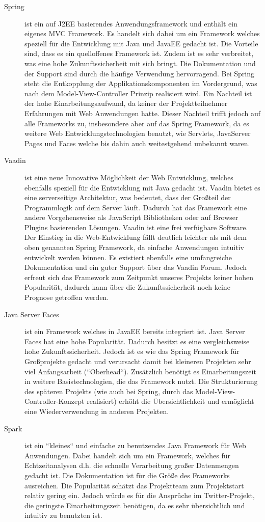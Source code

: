 \begin{description}
	\item [Spring] ist ein auf J2EE basierendes Anwendungsframework und enthält ein eigenes MVC Framework. Es handelt sich dabei um ein Framework welches speziell für die Entwicklung mit Java und JavaEE gedacht ist. Die Vorteile sind, dass es ein quelloffenes Framework ist. Zudem ist es sehr verbreitet, was eine hohe Zukunftssicherheit mit sich bringt. Die Dokumentation und der Support sind durch die häufige Verwendung hervorragend. Bei Spring steht die Entkopplung der Applikationskomponenten im Vordergrund, was nach dem Model-View-Controller Prinzip realisiert wird. Ein Nachteil ist der hohe Einarbeitungsaufwand, da keiner der Projektteilnehmer Erfahrungen mit Web Anwendungen hatte. Dieser Nachteil trifft jedoch auf alle Frameworks zu, insbesondere aber auf das Spring Framework, da es weitere Web Entwicklungstechnologien benutzt, wie Servlets, JavaServer Pages und Faces welche bis dahin auch weitestgehend unbekannt waren.
	\item [Vaadin] ist eine neue Innovative Möglichkeit der Web Entwicklung, welches ebenfalls speziell für die Entwicklung mit Java gedacht ist. Vaadin bietet es eine serverseitige Architektur, was bedeutet, dass der Großteil der Programmlogik auf dem Server läuft. Dadurch hat das Framework eine andere Vorgehensweise als JavaScript Bibliotheken oder auf Browser Plugins basierenden Lösungen. Vaadin ist eine frei verfügbare Software. Der Einstieg in die Web-Entwicklung fällt deutlich leichter als mit dem oben genannten Spring Framework, da einfache Anwendungen intuitiv entwickelt werden können. Es existiert ebenfalls eine umfangreiche Dokumentation und ein guter Support über das Vaadin Forum. Jedoch erfreut sich das Framework zum Zeitpunkt unseres Projekts keiner hohen Popularität, dadurch kann über die Zukunftssicherheit noch keine Prognose getroffen werden. 
	\item [Java Server Faces] ist ein Framework welches in JavaEE bereits integriert ist. Java Server Faces hat eine hohe Popularität. Dadurch besitzt es eine vergleichsweise hohe Zukunftssicherheit. Jedoch ist es wie das Spring Framework für Großprojekte gedacht und verursacht damit bei kleineren Projekten sehr viel Anfangsarbeit (“Oberhead“). Zusätzlich benötigt es Einarbeitungszeit in weitere Basistechnologien, die das Framework nutzt. Die Strukturierung des späteren Projekts (wie auch bei Spring, durch das Model-View-Controller-Konzept realisiert) erhöht die Übersichtlichkeit und ermöglicht eine Wiederverwendung in anderen Projekten.
	\item [Spark] ist ein “kleines“ und einfache zu benutzendes Java Framework für Web Anwendungen. Dabei handelt sich um ein Framework, welches für Echtzeitanalysen d.h. die schnelle Verarbeitung großer Datenmengen gedacht ist. Die Dokumentation ist für die Größe des Frameworks ausreichen. Die Popularität schätzt das Projektteam zum Projektstart relativ gering ein. Jedoch würde es für die Ansprüche im Twitter-Projekt, die geringste Einarbeitungszeit benötigen, da es sehr übersichtlich und intuitiv zu benutzten ist. 
\end{description}

